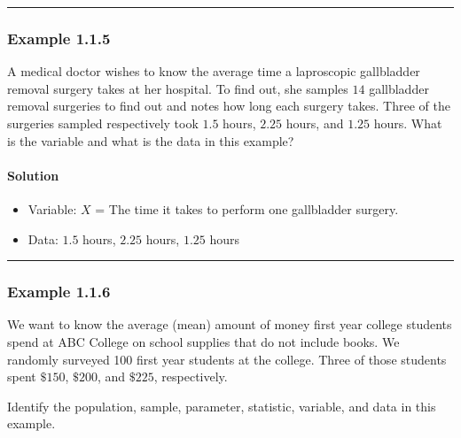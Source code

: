 \documentclass[letterpaper,10pt,english]{jupyterBook}
\begin{document}
\bigskip\hrule\bigskip



\subsubsection{Example 1.1.5}
\label{\detokenize{Ch1 Sampling and Data/1.1 Key Terms in Statistics:example-1-1-5}}
\sphinxAtStartPar
A medical doctor wishes to know the average time a laproscopic gallbladder removal surgery takes at her hospital. To find out, she samples \(14\) gallbladder removal surgeries to find out and notes how long each surgery takes. Three of the surgeries sampled respectively took \(1.5\) hours, \(2.25\) hours, and \(1.25\) hours. What is the variable and what is the data in this example?


\paragraph{Solution}
\label{\detokenize{Ch1 Sampling and Data/1.1 Key Terms in Statistics:id4}}\begin{itemize}
\item {} 
\sphinxAtStartPar
Variable: \(X\) = The time it takes to perform one gallbladder surgery.

\item {} 
\sphinxAtStartPar
Data: \(1.5\) hours, \(2.25\) hours, \(1.25\) hours

\end{itemize}


\bigskip\hrule\bigskip



\subsubsection{Example 1.1.6}
\label{\detokenize{Ch1 Sampling and Data/1.1 Key Terms in Statistics:example-1-1-6}}
\sphinxAtStartPar
We want to know the average (mean) amount of money first year college students spend at ABC College on school supplies that do not include books. We randomly surveyed 100 first year students at the college. Three of those students spent \(\$150\), \(\$200\), and \(\$225\), respectively.

\sphinxAtStartPar
Identify the population, sample, parameter, statistic, variable, and data in this example.
\end{document}
